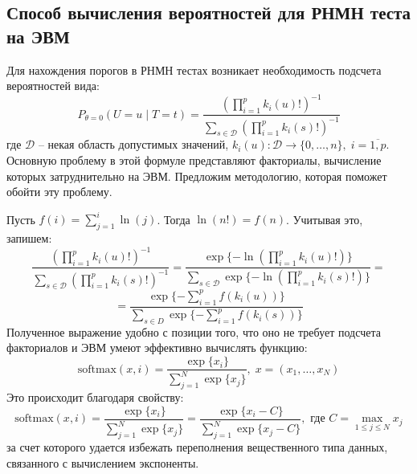 \subsection{Способ вычисления вероятностей для РНМН теста
на ЭВМ}

Для нахождения порогов в РНМН тестах возникает необходимость
подсчета вероятностей вида:
$$P_{\theta=0}(U=u \mid T=t)=\dfrac{(\prod_{i=1}^p k_i(u)!)^{-1}}
            {\sum_{s\in \mathcal{D}} (\prod_{i=1}^p k_i(s)!)^{-1}}$$
где $\mathcal{D}$ -- некая область допустимых значений,
$k_i(u):\mathcal{D} \to \{0,\ldots,n\}, \; i=\overline{1,p}$.
Основную проблему в этой формуле представляют 
факториалы, вычисление которых затруднительно на ЭВМ. 
Предложим методологию, которая поможет обойти эту проблему.

    Пусть $f(i)=\sum_{j=1}^{i} \ln(j)$. Тогда $\ln(n!)=f(n)$.
    Учитывая это, запишем:
    $$
    \dfrac{(\prod_{i=1}^p k_i(u)!)^{-1}}
            {\sum_{s\in \mathcal{D}} (\prod_{i=1}^p k_i(s)!)^{-1}}=
    \dfrac{\exp\{-\ln(\prod_{i=1}^p k_i(u)!)\}}
    {\sum_{s\in \mathcal{D}} \exp \{-\ln(\prod_{i=1}^p k_i(s)!)\}}=
    $$
    $$
    = \dfrac{\exp \{ -\sum_{i=1}^p f(k_i(u)) \}}
    {\sum_{s \in D} \exp \{ -\sum_{i=1}^p f(k_i(s)) \}}
    $$
Полученное выражение удобно с позиции того, что оно не требует подсчета факториалов и ЭВМ умеют 
эффективно вычислять функцию:
$$
\text{softmax}(x,i)=\dfrac{\exp\{x_i\}}{\sum_{j=1}^{N} \exp\{x_j\}}, \; x=(x_1,\ldots,x_N)
$$
Это происходит благодаря свойству:
$$
\text{softmax}(x,i)=\dfrac{\exp\{x_i\}}{\sum_{j=1}^{N} \exp\{x_j\}} = \dfrac{\exp\{x_i - C\}}{\sum_{j=1}^{N} \exp\{x_j - C\}}
, \text{ где } C=\max_{1\leq j \leq N} x_j
$$
за счет которого удается избежать переполнения вещественного типа данных, 
связанного с вычислением экспоненты.

